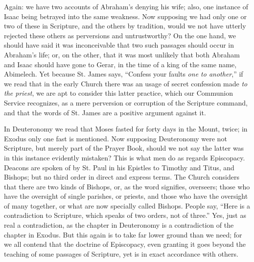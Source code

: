 Again: we have two accounts of Abraham's denying his wife; also,
one instance of Isaac being betrayed into the same weakness. Now
supposing we had only one or two of these in Scripture, and the others
by tradition, would we not have utterly rejected these others as
perversions and untrustworthy? On the one hand, we should have said it
was inconceivable that two such passages should occur in Abraham's
life; or, on the other, that it was most unlikely that both Abraham
and Isaac should have gone to Gerar, in the time of a king of the same
name, Abimelech. Yet because St. James says, ``Confess your faults
\emph{one to another},'' if we read that in the early Church there
was an usage of secret confession made \emph{to the priest}, we are
apt to consider this latter practice, which our Communion Service
recognizes, as a mere perversion or corruption of the Scripture
command, and that the words of St. James are a positive argument
against it.

In Deuteronomy we read that Moses fasted for forty days in the
Mount, twice; in Exodus only one fast is mentioned. Now supposing
Deuteronomy were not Scripture, but merely part of the Prayer Book,
should we not say the latter was in this instance evidently mistaken?
This is what men do as regards Episcopacy. Deacons are spoken of by
St. Paul in his Epistles to Timothy and Titus, and Bishops; but no
third order in direct and express terms. The Church considers that
there are two kinds of Bishops, or, as the word signifies, overseers;
those who have the oversight of single parishes, or priests, and those
who have the oversight of many together, or what are now specially
called Bishops. People say, ``Here is a contradiction to
Scripture, which speaks of two orders, not of three.'' Yes, just
as real a contradiction, as the chapter in Deuteronomy is a
contradiction of the chapter in Exodus. But this again is to take far
lower ground than we need; for we all contend that the doctrine of
Episcopacy, even granting it goes beyond the teaching of some passages
of Scripture, yet is in exact accordance with others.

